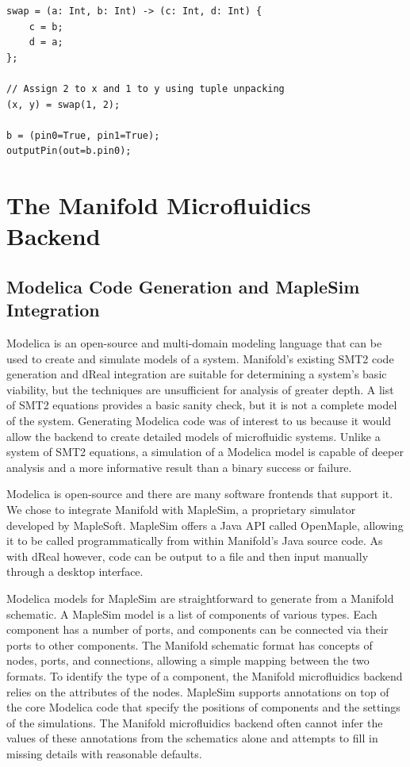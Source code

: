 \begin{lstlisting}[label=lst:unpacking, caption=A module imported into a Manifold file]
swap = (a: Int, b: Int) -> (c: Int, d: Int) {
    c = b;
    d = a;
};

// Assign 2 to x and 1 to y using tuple unpacking
(x, y) = swap(1, 2);

b = (pin0=True, pin1=True);
outputPin(out=b.pin0);
\end{lstlisting}

\section{The Manifold Microfluidics Backend}

\subsection{Modelica Code Generation and MapleSim Integration}

Modelica is an open-source and multi-domain modeling language that can be used
to create and simulate models of a system.
Manifold's existing SMT2 code generation and dReal integration are suitable for
determining a system's basic viability, but the techniques are unsufficient for
analysis of greater depth.
A list of SMT2 equations provides a basic sanity check, but it is not a complete model of the system.
Generating Modelica code was of interest to us because it would allow the
backend to create detailed models of microfluidic systems.
Unlike a system of SMT2 equations, a simulation of a Modelica model is capable
of deeper analysis and a more informative result than a binary success or
failure.

Modelica is open-source and there are many software frontends that support it.
We chose to integrate Manifold with MapleSim, a proprietary simulator developed by MapleSoft.
MapleSim offers a Java API called OpenMaple, allowing it to be called programmatically from within Manifold's Java source code.
As with dReal however, code can be output to a file and then input manually through a desktop interface.

Modelica models for MapleSim are straightforward to generate from a Manifold
schematic. A MapleSim model is a list of components of various types. Each
component has a number of ports, and components can be connected via their
ports to other components. The Manifold schematic format has concepts of
nodes, ports, and connections, allowing a simple mapping between the two
formats. To identify the type of a component, the Manifold microfluidics
backend relies on the attributes of the nodes. MapleSim supports annotations
on top of the core Modelica code that specify the positions of components and
the settings of the simulations. The Manifold microfluidics backend often
cannot infer the values of these annotations from the schematics alone and
attempts to fill in missing details with reasonable defaults.

